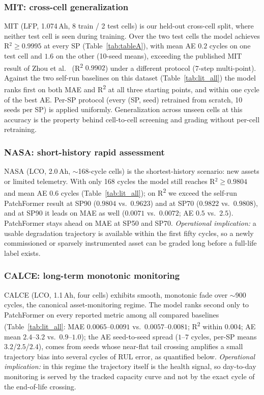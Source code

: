 \documentclass[final,5p,times,twocolumn]{elsarticle}
\begin{document}
\subsubsection{MIT: cross-cell generalization}
MIT (LFP, 1.074\,Ah, 8 train / 2 test cells) is our held-out cross-cell
split, where neither test cell is seen during training. Over the two
test cells the model achieves R$^2 \ge 0.9995$ at every SP
(Table~\ref{tab:tableA}), with mean AE $0.2$ cycles on one test cell
and $1.6$ on the other (10-seed means), exceeding the published MIT
result of Zhou et al.\ \cite{ref_zhou2025}
(R\textsuperscript{2} $0.9902$) under a different protocol (7-step multi-point).
Against the two self-run baselines on this dataset
(Table~\ref{tab:lit_all}) the model ranks first on both
MAE and R\textsuperscript{2} at all three starting points, and within one
cycle of the best AE. Per-SP protocol (every (SP, seed) retrained from scratch, 10 seeds
per SP) is applied uniformly. Generalization across unseen cells at
this accuracy is the property behind cell-to-cell screening and
grading without per-cell retraining.


\subsubsection{NASA: short-history rapid assessment}
NASA (LCO, 2.0\,Ah, $\sim$168-cycle cells) is the shortest-history
scenario: new assets or limited telemetry. With only 168 cycles the
model still reaches R$^2 \ge 0.9804$ and mean AE $0.6$ cycles
(Table~\ref{tab:lit_all}); on R\textsuperscript{2} we exceed the self-run
PatchFormer result at SP90
($0.9804$ vs.\ $0.9623$) and at SP70 ($0.9822$ vs.\ $0.9808$), and at
SP90 it leads on MAE as well ($0.0071$ vs.\ $0.0072$; AE $0.5$ vs.\
$2.5$). PatchFormer stays ahead on MAE at SP50 and SP70.
\emph{Operational implication:} a usable degradation trajectory is
available within the first fifty cycles, so a newly commissioned or
sparsely instrumented asset can be graded long before a full-life
label exists.



\subsubsection{CALCE: long-term monotonic monitoring}
CALCE (LCO, 1.1\,Ah, four cells) exhibits smooth, monotonic fade over
$\sim$900 cycles, the canonical asset-monitoring regime. The model
ranks second only to PatchFormer on every reported metric among all
compared baselines (Table~\ref{tab:lit_all}: MAE
$0.0065$--$0.0091$ vs.\ $0.0057$--$0.0081$; R\textsuperscript{2} within $0.004$; AE
mean $2.4$--$3.2$ vs.\ $0.9$--$1.0$); the AE seed-to-seed spread
($1$--$7$ cycles, per-SP means $3.2$/$2.5$/$2.4$), comes from seeds
whose near-flat tail crossing
amplifies a small trajectory bias into several cycles of RUL error,
as quantified below. \emph{Operational
implication:} in this regime the trajectory itself is the health
signal, so day-to-day monitoring is served by the tracked capacity
curve and not by the exact cycle of the end-of-life crossing.
\end{document}
